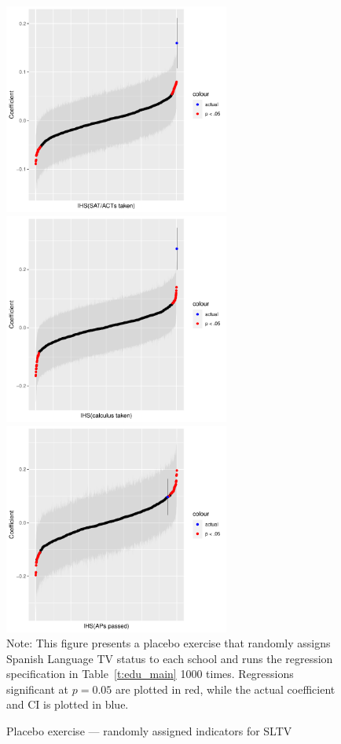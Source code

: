 \documentclass[11pt]{article}
\begin{document}
\begin{figure}[!hbtp]
\centering
\caption{Placebo exercise --- randomly assigned indicators for SLTV}\label{f:placebo_random}
\includegraphics[width=7.4cm]{../../analysis/Output/graphs/placebo_random_1.pdf}
\includegraphics[width=7.4cm]{../../analysis/Output/graphs/placebo_random_2.pdf}
\includegraphics[width=7.4cm]{../../analysis/Output/graphs/placebo_random_3.pdf} \\
Note: This figure presents a placebo exercise that randomly assigns Spanish Language TV status to each school and runs the regression specification in Table~\ref{t:edu_main} 1000 times.  Regressions significant at $p=0.05$ are plotted in red, while the actual coefficient and CI is plotted in blue.
\end{figure} 
\end{document}
